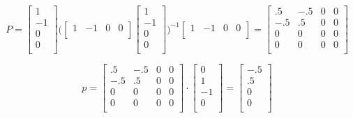 \documentclass{article}
\begin{document}
\[
P
=
\begin{bmatrix}
1 \\
-1 \\
0 \\
0 \\
\end{bmatrix}
\Bigg(
\begin{bmatrix}
1 & -1 & 0 & 0 \\
\end{bmatrix}
\begin{bmatrix}
1 \\
-1 \\
0 \\
0 \\
\end{bmatrix}
\Bigg)^{-1}
\begin{bmatrix}
1 & -1 & 0 & 0 \\
\end{bmatrix}
=
\begin{bmatrix}
.5 & -.5 & 0 & 0 \\
-.5 & .5 & 0 & 0 \\
0 & 0 & 0 & 0  \\
0 & 0 & 0 & 0  \\
\end{bmatrix}
\]

\[
p
=
\begin{bmatrix}
.5 & -.5 & 0 & 0 \\
-.5 & .5 & 0 & 0 \\
0 & 0 & 0 & 0  \\
0 & 0 & 0 & 0  \\
\end{bmatrix}
\cdot
\begin{bmatrix}
0 \\
1 \\
-1 \\
0 \\
\end{bmatrix}
=
\begin{bmatrix}
-.5 \\
.5 \\
0 \\
0 \\
\end{bmatrix}
\]
\end{document}
